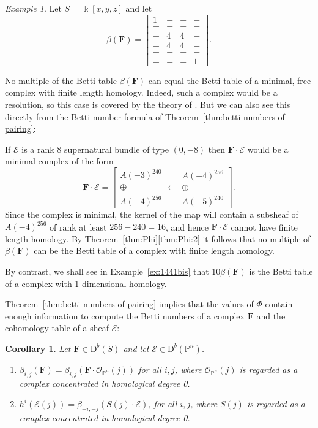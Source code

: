 \documentclass[12pt]{amsart}
\newtheorem{cor}[lemma]{Corollary}
\theoremstyle{definition}
\theoremstyle{remark}
\newtheorem{example}[lemma]{Example}
\newcommand{\kk}{\Bbbk}
\newcommand{\PP}{\mathbb{P}}
\newcommand{\cO}{\mathcal{O}}
\newcommand{\cE}{\mathcal{E}}
\newcommand{\FF}{\mathbf{F}}
\newcommand{\DD}{\mathrm{D}}
\renewcommand{\P}{{\mathbb P}}
\begin{document}
\begin{example}\label{ex:1441}
Let $S=\kk[x,y,z]$ and let
\begin{equation}\label{eqn:intro ex}
\beta(\FF)=\begin{bmatrix} 1&-&-&-\\ -&-&-&-\\-&4&4&-\\-&4&4&-\\-&-&-&-\\-&-&-&1 \end{bmatrix}.
\end{equation}

No multiple of the Betti table $\beta(\FF)$ can equal the Betti table of a minimal, free complex with finite length homology. Indeed, such a complex would be a resolution,  so this case is covered by the theory of \cite{eis-schrey1}. But we can also see this directly from the Betti number formula of Theorem~\ref{thm:betti numbers of pairing}:

If $\cE$ is a rank $8$ supernatural bundle of type $(0,-8)$ then 
$\FF\cdot \cE$ would be a minimal complex of the form
\[
\FF\cdot \cE=\left[ \begin{matrix}A(-3)^{240}\\ \oplus \\A(-4)^{256}\end{matrix} \longleftarrow \begin{matrix}A(-4)^{256}\\\oplus \\ A(-5)^{240}\end{matrix}\right].
\]
Since the complex is minimal, the kernel of the map will contain a subsheaf of $A(-4)^{256}$ of rank at least $256-240=16$, and hence $\FF\cdot \cE$ cannot have finite length homology.  By Theorem~\ref{thm:Phi}\eqref{thm:Phi:2} it follows that no multiple of $\beta(\FF)$ can be the Betti table of a complex with finite length homology. 

By contrast, we shall see in Example~\ref{ex:1441bis} that 
 $10\beta(\FF)$ is the Betti table of a complex with 1-dimensional homology.
\end{example}

 Theorem~\ref{thm:betti numbers of pairing} implies that the values of $\Phi$ contain enough
 information to compute the Betti numbers of a complex $\FF$ and the cohomology
table of a sheaf $\cE$:
\begin{cor} Let $\FF\in \DD^b(S)$ and let $\cE\in \DD^b(\PP^n)$.
\begin{enumerate}
\item 
 $\beta_{i,j}(\FF) = \beta_{i,j}(\FF\cdot \cO_{\P^{n}}(j))$ for all $i,j$, where $\cO_{\PP^n}(j)$ is regarded as a complex concentrated in homological degree 0.
\item $h^{i}(\cE(j)) = \beta_{-i,-j}(S(j)\cdot \cE)$, for all $i,j$, where $S(j)$ is regarded as a complex concentrated in homological degree 0.
\end{enumerate}
\end{cor}
\end{document}
